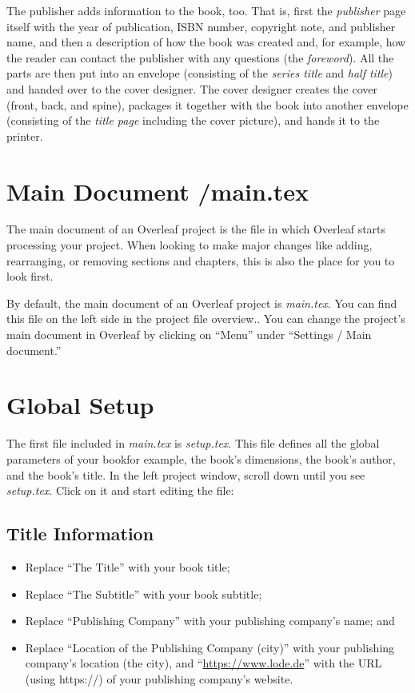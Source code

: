 The publisher adds information to the book, too. That is, first the \textit{publisher} page itself with the year of publication, ISBN number, copyright note, and publisher name, and then a description of how the book was created and, for example, how the reader can contact the publisher with any questions (the \textit{foreword}). All the parts are then put into an envelope (consisting of the \textit{series title} and \textit{half title}) and handed over to the cover designer. The cover designer creates the cover (front, back, and spine), packages it together with the book into another envelope (consisting of the \textit{title page} including the cover picture), and hands it to the printer. 

\section{Main Document /main.tex}\label{entrypoint:sec}

The main document of an Overleaf project is the file in which Overleaf starts processing your project. When looking to make major changes like adding, rearranging, or removing sections and chapters, this is also the place for you to look first. 

By default, the main document of an Overleaf project is \textit{main.tex}. You can find this file on the left side in the project file overview.. You can change the project's main document in Overleaf by clicking on ``Menu'' under ``Settings / Main document.''


\section{Global Setup}\label{globalsetup:sec}

The first file included in \textit{main.tex} is \textit{setup.tex}. This file defines all the global parameters of your book\emdash{}for example, the book's dimensions, the book's author, and the book's title. In the left project window, scroll down until you see \textit{setup.tex}. Click on it and start editing the file:


\subsection{Title Information}

\begin{itemize}
\item Replace ``The Title'' with your book title;
\item Replace ``The Subtitle'' with your book subtitle;
\item Replace ``Publishing Company'' with your publishing company's name; and
\item Replace ``Location of the Publishing Company (city)'' with your publishing company's location (the city), and ``\url{https://www.lode.de}'' with the URL (using https://) of your publishing company's website.
\end{itemize}

